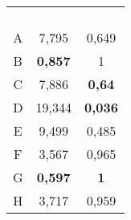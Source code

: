 \begin{table}[!htb]
\begin{subtable}{0.45\linewidth}
\begin{tabular}{@{}ccc@{}}
			& & \\
			& & \\
			& & \\
			& & \\ \midrule
			A & 7,795 & 0,649 \\
			B & \textbf{0,857} & 1 \\
			C & 7,886 & \textbf{0,64} \\
			D & 19,344 & \textbf{0,036} \\
			E & 9,499 & 0,485 \\
			F & 3,567 & 0,965 \\
			G & \textbf{0,597} & \textbf{1} \\
			H & 3,717 & 0,959 \\ \bottomrule
		\end{tabular}
	\end{subtable}
	
	\vspace{1em}
	

\end{table}

